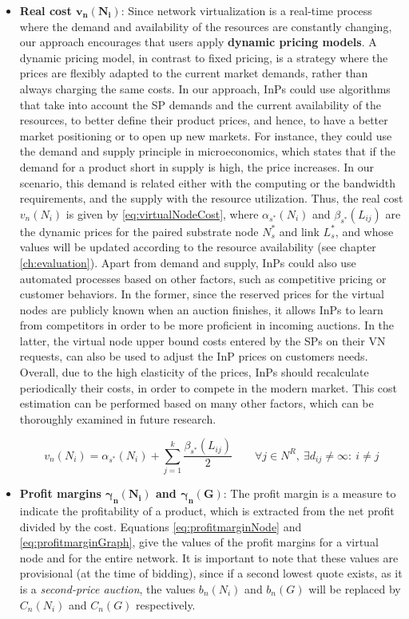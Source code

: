 \begin{itemize}
 \item \textbf{Real cost $\mathbf{v_n(N_i)}$}: Since network virtualization is a real-time process where the demand and availability of the resources are constantly changing, our approach encourages that users apply \textbf{dynamic pricing models}. A dynamic pricing model, in contrast to fixed pricing, is a strategy where the prices are flexibly adapted to the current market demands, rather than always charging the same costs. In our approach, InPs could use algorithms that take into account the SP demands and the current availability of the resources, to better define their product prices, and hence, to have a better market positioning or to open up new markets. For instance, they could use the demand and supply principle in microeconomics, which states that if the demand for a product short in supply is high, the price increases. In our scenario, this demand is related either with the computing or the bandwidth requirements, and the supply with the resource utilization. Thus, the real cost $v_n(N_i)$ is given by \eqref{eq:virtualNodeCost}, where $\alpha_{s^{*}}(N_i)$ and $\beta_{s^{*}}(L_{ij})$ are the dynamic prices for the paired substrate node $N_s^{*}$ and link $L_s^{*}$, and whose values will be updated according to the resource availability (see chapter \ref{ch:evaluation}). Apart from demand and supply, InPs could also use automated processes based on other factors, such as competitive pricing or customer behaviors. In the former, since the reserved prices for the virtual nodes are publicly known when an auction finishes, it allows InPs to learn from competitors in order to be more proficient in incoming auctions. In the latter, the virtual node upper bound costs entered by the SPs on their VN requests, can also be used to adjust the InP prices on customers needs. Overall, due to the high elasticity of the prices, InPs should recalculate periodically their costs, in order to compete in the modern market. This cost estimation can be performed based on many other factors, which can be thoroughly examined in future research.
 
  \begin{equation} \label{eq:virtualNodeCost}
	v_n(N_i) = \alpha_{s^{*}}(N_i) + \sum_{j = 1}^{k} {\frac{\beta_{s^{*}}(L_{ij})}{2}} \qquad \forall j \in N^{R}, \ \exists d_{ij} \neq \infty : \ i \neq j
  \end{equation}
  
  \item \textbf{Profit margins $\mathbf{\gamma_n(N_i)}$ and $\mathbf{\gamma_n(G)}$}: The profit margin is a measure to indicate the profitability of a product, which is extracted from the net profit divided by the cost. Equations \eqref{eq:profitmarginNode} and \eqref{eq:profitmarginGraph}, give the values of the profit margins for a virtual node and for the entire network. It is important to note that these values are provisional (at the time of bidding), since if a second lowest quote exists, as it is a \textit{second-price auction}, the values $b_n(N_i)$ and $b_n(G)$ will be replaced by $C_n(N_i)$ and $C_n(G)$ respectively. 


\end{itemize}

